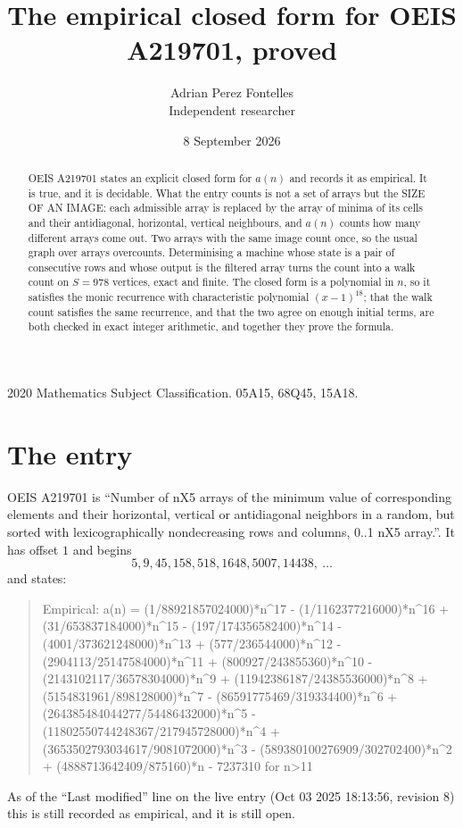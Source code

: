 \documentclass[11pt,a4paper]{article}
\title{The empirical closed form for OEIS A219701, proved}
\author{Adrian Perez Fontelles\\ \small Independent researcher}
\date{8 September 2026}
\theoremstyle{plain}
\theoremstyle{definition}
\begin{document}
\maketitle

\begin{abstract}
OEIS A219701 states an explicit closed form for $a(n)$ and records it as empirical. It is true, and
it is decidable. What the entry counts is not a set of arrays but the SIZE OF AN IMAGE: each
admissible array is replaced by the array of minima of its cells and their antidiagonal, horizontal, vertical neighbours,
and $a(n)$ counts how many different arrays come out. Two arrays with the same image count
once, so the usual graph over arrays overcounts. Determinising a machine whose state is a pair
of consecutive rows and whose output is the filtered array turns the count into a walk count on
$S=978$ vertices, exact and finite. The closed form is a polynomial in $n$, so it satisfies the
monic recurrence with characteristic polynomial $(x-1)^{18}$; that the walk count
satisfies the same recurrence, and that the two agree on enough initial terms, are both checked
in exact integer arithmetic, and together they prove the formula.
\end{abstract}

\noindent\small 2020 Mathematics Subject Classification. 05A15, 68Q45, 15A18.\normalsize

\section{The entry}

OEIS A219701 is ``Number of nX5 arrays of the minimum value of corresponding elements and their horizontal, vertical or antidiagonal neighbors in a random, but sorted with lexicographically nondecreasing rows and columns, 0..1 nX5 array.''. It has offset $1$ and begins
\[
5, 9, 45, 158, 518, 1648, 5007, 14438,\ \dots
\]
and states:
\begin{quote}
Empirical: a(n) = (1/88921857024000)*n\^{}17 - (1/1162377216000)*n\^{}16 + (31/653837184000)*n\^{}15 - (197/174356582400)*n\^{}14 - (4001/373621248000)*n\^{}13 + (577/236544000)*n\^{}12 - (2904113/25147584000)*n\^{}11 + (800927/243855360)*n\^{}10 - (2143102117/36578304000)*n\^{}9 + (11942386187/24385536000)*n\^{}8 + (5154831961/898128000)*n\^{}7 - (86591775469/319334400)*n\^{}6 + (264385484044277/54486432000)*n\^{}5 - (11802550744248367/217945728000)*n\^{}4 + (3653502793034617/9081072000)*n\^{}3 - (589380100276909/302702400)*n\^{}2 + (4888713642409/875160)*n - 7237310 for n>11
\end{quote}
As of the ``Last modified'' line on the live entry (Oct 03 2025 18:13:56, revision 8)
this is still recorded as empirical, and it is still open.
\end{document}
